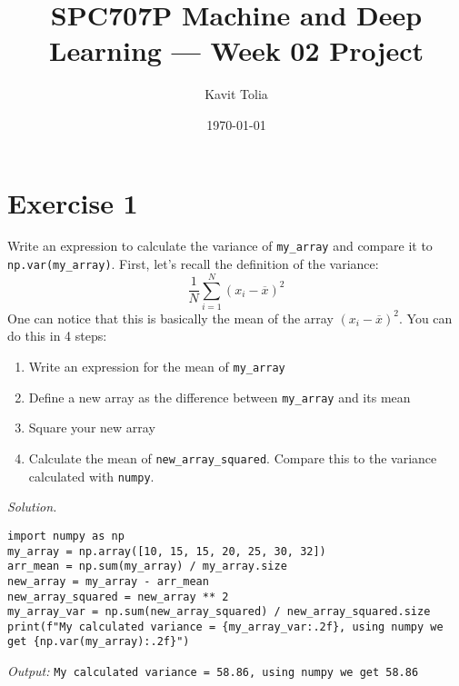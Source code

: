 \documentclass[11pt]{article}
\title{SPC707P Machine and Deep Learning — Week 02 Project}
\author{Kavit Tolia}
\date{\today}
\begin{document}
\maketitle

\pagestyle{fancy}
\fancyhf{}%


\section{Exercise 1}
Write an expression to calculate the variance of \texttt{my\_array} and compare it to \texttt{np.var(my\_array)}. First, let's recall the definition of the variance:
\[
 \dfrac{1}{N} \sum_{i=1}^{N} (x_i - \overline{x})^2
\]
One can notice that this is basically the mean of the array $(x_i - \overline{x})^2$. You can do this in 4 steps:
\begin{enumerate}
    \item Write an expression for the mean of \texttt{my\_array}
    \item Define a new array as the difference between \texttt{my\_array} and its mean
    \item Square your new array
    \item Calculate the mean of \texttt{new\_array\_squared}. Compare this to the variance calculated with \texttt{numpy}.
\end{enumerate}
\textit{Solution.} 
\begin{lstlisting}
import numpy as np
my_array = np.array([10, 15, 15, 20, 25, 30, 32])
arr_mean = np.sum(my_array) / my_array.size
new_array = my_array - arr_mean
new_array_squared = new_array ** 2
my_array_var = np.sum(new_array_squared) / new_array_squared.size
print(f"My calculated variance = {my_array_var:.2f}, using numpy we get {np.var(my_array):.2f}")
\end{lstlisting}
\textit{Output:} \texttt{My calculated variance = 58.86, using numpy we get 58.86}
\end{document}
